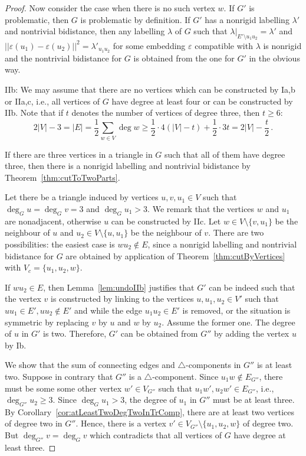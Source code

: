 \documentclass[a4paper, 11pt]{article}
\newcommand{\trcomp}{$\triangle$-component}
\newcommand{\trcomps}{$\triangle$-components}
\theoremstyle{definition}
\begin{document}
\begin{proof}
Now consider the case when there is no such vertex $w$. If $G'$ is problematic, then $G$ is problematic by definition. If $G'$ has a nonrigid labelling $\lambda'$ and nontrivial bidistance, then any labelling $\lambda$ of $G$ such that $\lambda|_{E'\setminus u_1u_2}=\lambda'$ and $||\varepsilon(u_1)-\varepsilon(u_2)||^2=\lambda'_{u_1u_2}$ for some embedding $\varepsilon$ compatible with $\lambda$ is nonrigid and the nontrivial bidistance for $G$ is obtained from the one for $G'$ in the obvious way.

IIb: We may assume that there are no vertices which can be constructed by Ia,b or IIa,c, i.e., all vertices of $G$ have degree at least four or can be constructed by IIb. Note that if $t$ denotes the number of vertices of degree three, then $t\geq 6$:
$$
2|V|-3=|E|=\frac{1}{2} \sum_{w\in V} \deg w\geq \frac{1}{2}\cdot 4(|V|-t)+\frac{1}{2}\cdot 3 t=2|V|-\frac{t}{2}\,.
$$

If there are three vertices in a triangle in $G$ such that all of them have degree three, then there is a nonrigid labelling and nontrivial bidistance by Theorem~\ref{thm:cutToTwoParts}.

Let there be a triangle induced by vertices $u,v, u_1\in V$ such that $\deg_G u =\deg_G v=3$ and $\deg_G u_1>3$. We remark that the vertices $w$ and $u_1$ are nonadjacent, otherwise $u$ can be constructed by IIc. Let $w\in V\setminus \{v, u_1\}$ be the neighbour of $u$ and $u_2\in V\setminus \{u, u_1\}$ be the neighbour of $v$. There are two possibilities: the easiest case is  $wu_2\notin E$, since  a nonrigid labelling and nontrivial bidistance for $G$ are obtained by application of Theorem~\ref{thm:cutByVertices} with $V_c=\{u_1,u_2,w\}$. 

If $wu_2\in E$, then Lemma~\ref{lem:undoIIb} justifies that $G'$ can be indeed such that the vertex $v$ is constructed by linking to the vertices $u,u_1,u_2 \in V'$ such that $uu_1\in E',uu_2\notin E'$ and while the edge $u_1u_2\in E'$ is removed, or the situation is symmetric by replacing $v$ by $u$ and $w$ by $u_2$. Assume the former one. The degree of $u$ in $G'$ is two. Therefore, $G'$ can be obtained from $G''$ by adding the vertex $u$ by Ib. 

We show that the sum of connecting edges and \trcomps{} in $G''$ is at least two. Suppose in contrary that $G''$ is a \trcomp{}. Since $u_1w\notin E_{G''}$, there must be some some other vertex $w'\in V_{G''}$ such that $u_1w',u_2w'\in E_{G''}$, i.e., $\deg_{G''} u_2 \geq 3$. Since $\deg_G u_1>3$, the degree of $u_1$ in $G''$ must be at least three. By Corollary~\ref{cor:atLeastTwoDegTwoInTrComp}, there are at least two vertices of degree two in $G''$. Hence, there is a vertex $v'\in V_{G''}\setminus\{u_1,u_2,w\}$ of degree two. But $\deg_{G''}v=\deg_G v$ which contradicts that all vertices of $G$ have degree at least three. 


\end{proof}
\end{document}
